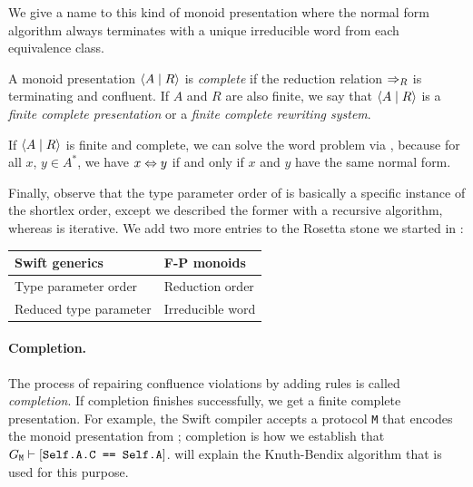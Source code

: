 \documentclass[../generics]{subfiles}
\begin{document}
We give a name to this kind of monoid presentation where the normal form algorithm always terminates with a unique irreducible word from each equivalence class.

\begin{definition}
A monoid presentation $\langle A \mid R\rangle$ is \emph{complete} if the reduction relation $\Rightarrow_R$ is terminating and confluent. If $A$ and $R$ are also finite, we say that $\langle A \mid R\rangle$ is a \emph{finite complete presentation} or a \emph{finite complete rewriting system}.
\end{definition}

\begin{corollary}\label{complete decidable}
If $\langle A \mid R\rangle$ is finite and complete, we can solve the word problem via , because for all $x$, $y\in A^*$, we have $x\Leftrightarrow y$ if and only if $x$ and $y$ have the same normal form.
\end{corollary}

Finally, observe that the type parameter order of  is basically a specific instance of the shortlex order, except we described the former with a recursive algorithm, whereas  is iterative.
We add two more entries to the Rosetta stone we started in :
\begin{center}
\begin{tabular}{ll}
\toprule
\textbf{Swift generics}&\textbf{F-P monoids}\\
\midrule
Type parameter order&Reduction order\\
Reduced type parameter&Irreducible word\\
\bottomrule
\end{tabular}
\end{center}

\paragraph{Completion.} The process of repairing confluence violations by adding rules is called \emph{completion}. If completion finishes successfully, we get a finite complete presentation. For example, the Swift compiler accepts a protocol \texttt{M} that encodes the monoid presentation from ; completion is how we establish that $G_\texttt{M}\vdash[\texttt{Self.A.C == Self.A}]$.  will explain the Knuth-Bendix algorithm that is used for this purpose.
\end{document}
